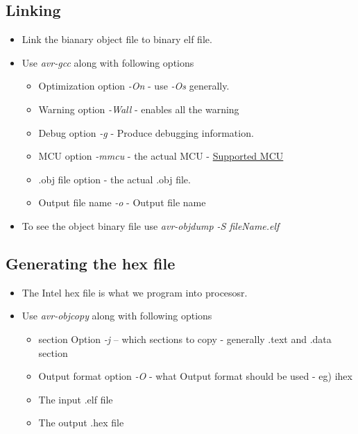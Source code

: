 \documentclass{article}
\begin{document}
\subsection*{Linking}
\begin{itemize}
    \item Link the bianary object file to binary elf file.
    \item Use \emph{avr-gcc} along with following options
    \begin{itemize}
        \item Optimization option \emph{-On} - use \emph{-Os} generally.
        \item Warning option \emph{-Wall} - enables all the warning
        \item Debug option \emph{-g} - Produce debugging information.
        \item MCU option \emph{-mmcu} - the actual MCU - \href{https://www.nongnu.org/avr-libc/user-manual/#supp_devices}{Supported MCU}
        \item .obj file option - the actual .obj file.
        \item Output file name \emph{-o} - Output file name

    \end{itemize}
    \item To see the object binary file use \emph{avr-objdump -S fileName.elf}
\end{itemize}

\subsection*{Generating the hex file}
\begin{itemize}
    \item The Intel hex file is what we program into procesosr.
    \item Use \emph{avr-objcopy} along with following options
    \begin{itemize}
        \item section Option \emph{-j} -- which sections to copy - generally .text and .data section
        \item Output format option \emph{-O} - what Output format should be used - eg) ihex
        \item The input .elf file
        \item The output .hex file
    \end{itemize}

\end{itemize}
\end{document}
